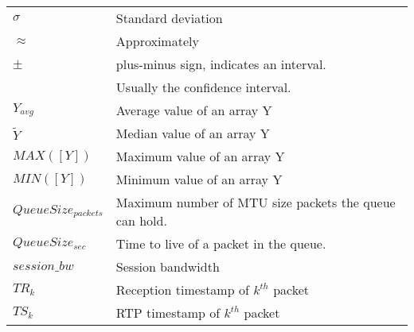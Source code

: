 \begin{longtable}{ll}
$\sigma$	& 	Standard deviation \\
$\approx$ 	& 	Approximately \\
$\pm$		& plus-minus sign, indicates an interval. \\
			& Usually the confidence interval. \\
$Y_{avg}$ 	& Average value of an array Y \\
$\widetilde{Y}$ & Median value of an array Y \\
$MAX([Y])$ 	& Maximum value of an array Y \\
$MIN([Y])$ 	& Minimum value of an array Y \\
$QueueSize_{packets}$ & Maximum number of MTU size packets the queue can hold.\\
$QueueSize_{sec}$ & Time to live of a packet in the queue.\\
$session\_bw$	& Session bandwidth \\
$TR_k$ 		& 	Reception timestamp of $k^{th}$ packet \\
$TS_k$ 		& 	RTP timestamp of $k^{th}$ packet \\





\end{longtable}
